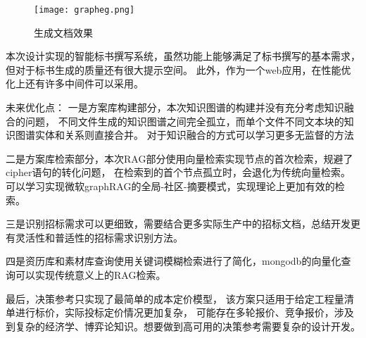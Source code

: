 \documentclass{xmu}
\begin{document}
    \begin{figure}[!htb]
        \centering
        \texttt{[image: grapheg.png]}\\
        \caption{生成文档效果
        }\label{text}
    \end{figure}

本次设计实现的智能标书撰写系统，虽然功能上能够满足了标书撰写的基本需求，
但对于标书生成的质量还有很大提示空间。
此外，作为一个web应用，在性能优化上还有许多中间件可以采用。

未来优化点：
一是方案库构建部分，本次知识图谱的构建并没有充分考虑知识融合的问题，
不同文件生成的知识图谱之间完全孤立，而单个文件不同文本块的知识图谱实体和关系则直接合并。
对于知识融合的方式可以学习更多无监督的方法

二是方案库检索部分，本次RAG部分使用向量检索实现节点的首次检索，规避了cipher语句的转化问题，
在检索到的首个节点孤立时，会退化为传统向量检索。
可以学习实现微软graphRAG的全局-社区-摘要模式，实现理论上更加有效的检索。

三是识别招标需求可以更细致，需要结合更多实际生产中的招标文档，总结开发更有灵活性和普适性的招标需求识别方法。

四是资历库和素材库查询使用关键词模糊检索进行了简化，mongodb的向量化查询可以实现传统意义上的RAG检索。

最后，决策参考只实现了最简单的成本定价模型，
该方案只适用于给定工程量清单进行标价，实际投标定价情况更加复杂，
可能存在多轮报价、竞争报价，涉及到复杂的经济学、博弈论知识。想要做到高可用的决策参考需要复杂的设计开发。
\end{document}
